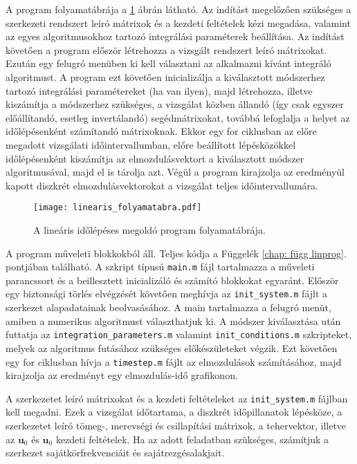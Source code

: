 A program folyamatábrája a \ref{fig:linprog} ábrán látható. Az indítást megelőzően szükséges  a szerkezeti rendszert leíró mátrixok és a kezdeti feltételek kézi megadása, valamint az egyes algoritmusokhoz tartozó integrálási paraméterek beállítása. Az indítást követően a program először létrehozza a  vizsgált rendszert leíró mátrixokat. Ezután egy felugró menüben ki kell választani az alkalmazni kívánt integráló algoritmust. A program ezt követően inicializálja a kiválasztott módszerhez tartozó integrálási paramétereket (ha van ilyen), majd létrehozza, illetve kiszámítja a módszerhez szükséges, a vizsgálat közben állandó (így csak egyszer előállítandó, esetleg invertálandó) segédmátrixokat, továbbá lefoglalja a helyet az időlépésenként  számítandó mátrixoknak. Ekkor egy for ciklusban az előre megadott vizsgálati időintervallumban, előre beállított lépésközökkel időlépésenként kiszámítja az elmozdulásvektort a kiválasztott módszer algoritmusával, majd el is tárolja azt. Végül a program kirajzolja az eredményül kapott diszkrét elmozdulásvektorokat a vizsgálat teljes időintervallumára.  
 
\begin{figure}[h!]
\centering
\texttt{[image: linearis\_folyamatabra.pdf]}
\caption{A lineáris időlépéses megoldó program folyamatábrája.}
\label{fig:linprog}
\end{figure}

A program műveleti blokkokból áll. Teljes kódja a Függelék \ref{chap: függ linprog}. pontjában található. A szkript típusú \verb|main.m| fájl tartalmazza a műveleti parancssort és a beillesztett inicializáló és számító blokkokat egyaránt.  Először egy biztonsági törlés elvégzését követően meghívja az \verb|init_system.m| fájlt a szerkezet alapadatainak beolvasásához. A main tartalmazza a felugró menüt, amiben a numerikus algoritmust választhatjuk ki. A módszer kiválasztása után futtatja az \verb|integration_parameters.m| valamint \verb|init_conditions.m| szkripteket, melyek az algoritmus futásához szükséges előkészületeket végzik. Ezt követően egy for ciklusban hívja a \verb|timestep.m| fájlt az elmozdulások számításához, majd kirajzolja az eredményt egy elmozdulás-idő grafikonon. 

A szerkezetet leíró mátrixokat és a kezdeti feltételeket az \verb|init_system.m| fájlban kell megadni. Ezek a vizsgálat időtartama, a diszkrét időpillanatok lépésköze, a szerkezetet leíró tömeg-, merevségi és csillapítási mátrixok, a tehervektor, illetve az $\mathbf{u}_0$ és  $\mathbf{\dot{u}}_0$  kezdeti feltételek. Ha az adott feladatban szükséges, számítjuk a szerkezet sajátkörfrekvenciáit és sajátrezgésalakjait.

